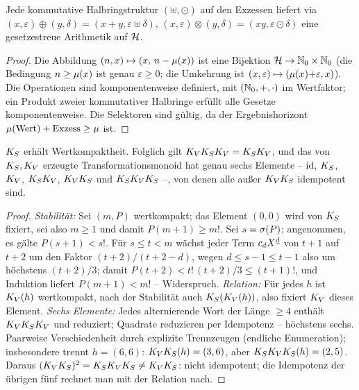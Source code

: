 \begin{satz}
Jede kommutative Halbringstruktur $(\uplus,\odot)$ auf den
Exzessen liefert via
$(x,\varepsilon)\oplus(y,\delta)=(x{+}y,\varepsilon\uplus\delta)$,
$(x,\varepsilon)\otimes(y,\delta)=(xy,\varepsilon\odot\delta)$
eine gesetzestreue Arithmetik auf $\mathcal H$.
\end{satz}

\begin{proof}
Die Abbildung $(n,x)\mapsto(x,\,n-\mu(x))$ ist eine Bijektion
$\mathcal H\to\mathbb N_0\times\mathbb N_0$ (die Bedingung $n\ge\mu(x)$ ist genau
$\varepsilon\ge0$; die Umkehrung ist
$(x,\varepsilon)\mapsto(\mu(x){+}\varepsilon,x)$). Die Operationen
sind komponentenweise definiert, mit $(\mathbb N_0,+,\cdot)$ im Wertfaktor;
ein Produkt zweier kommutativer Halbringe erfüllt alle Gesetze
komponentenweise. Die Selektoren sind gültig, da der
Ergebnishorizont $\mu(\text{Wert})+\text{Exzess}\ge\mu$ ist.
\end{proof}

\begin{satz}[Kompaktifizierungsmonoid]
$K_S$ erhält Wertkompaktheit. Folglich gilt
$K_VK_SK_V=K_SK_V$, und das von $K_S,K_V$ erzeugte
Transformationsmonoid hat genau sechs Elemente -- $\mathrm{id}$,
$K_S$, $K_V$, $K_SK_V$, $K_VK_S$ und $K_SK_VK_S$ --, von denen
alle außer $K_VK_S$ idempotent sind.
\end{satz}

\begin{proof}
\emph{Stabilität:} Sei $(m,P)$ wertkompakt; das Element $(0,0)$
wird von $K_S$ fixiert, sei also $m\ge1$ und damit
$P(m{+}1)\ge m!$. Sei $s=\sigma(P)$; angenommen, es gälte
$P(s{+}1)<s!$. Für $s\le t<m$ wächst
jeder Term $c_dX^{\underline{d}}$ von $t{+}1$ auf $t{+}2$ um den Faktor
$(t{+}2)/(t{+}2{-}d)$, wegen $d\le s{-}1\le t{-}1$ also um
höchstens $(t{+}2)/3$; damit
$P(t{+}2)<t!\,(t{+}2)/3\le(t{+}1)!$, und Induktion liefert
$P(m{+}1)<m!$ -- Widerspruch.
\emph{Relation:} Für jedes $h$ ist $K_V(h)$ wertkompakt, nach der
Stabilität auch $K_S(K_V(h))$, also fixiert $K_V$ dieses Element.
\emph{Sechs Elemente:} Jedes alternierende Wort der Länge $\ge4$
enthält $K_VK_SK_V$ und reduziert; Quadrate reduzieren per
Idempotenz -- höchstens sechs. Paarweise Verschiedenheit durch
explizite Trennzeugen (endliche Enumeration); insbesondere trennt
$h=(6,6)$: $K_VK_S(h)=(3,6)$, aber $K_SK_VK_S(h)=(2,5)$. Daraus
$(K_VK_S)^2=K_SK_VK_S\ne K_VK_S$: nicht idempotent; die Idempotenz
der übrigen fünf rechnet man mit der Relation nach.
\end{proof}

